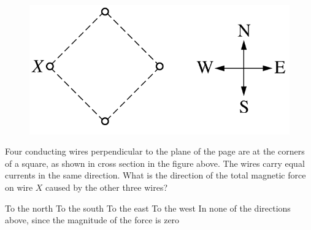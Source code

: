 \begin{figure}[H]
    \centering
    \includegraphics[scale=0.3]{images/img-007-012.png}
\end{figure}

\begin{questions}\setcounter{question}{17}\question
Four conducting wires perpendicular to the plane of the page are at the corners of a square, as shown in cross section in the figure above. The wires carry equal currents in the same direction. What is the direction of the total magnetic force on wire $X$ caused by the other three wires?

\begin{choices}
\choice To the north
\choice To the south
\choice To the east
\choice To the west
\choice In none of the directions above, since the magnitude of the force is zero
\end{choices}\end{questions}

